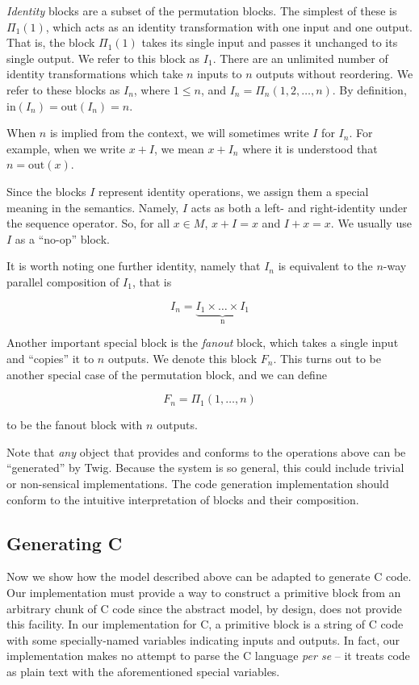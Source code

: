 \emph{Identity} blocks are a subset of the permutation blocks. The
simplest of these is $\Pi_1(1)$, which acts as an identity
transformation with one input and one output. That is, the block
$\Pi_1(1)$ takes its single input and passes it unchanged to its
single output. We refer to this block as $I_1$. There are an
unlimited number of identity transformations which take $n$ inputs
to $n$ outputs without reordering. We refer to these blocks as
$I_n$, where $1 \leq n$, and $I_n = \Pi_n(1,2,\ldots,n)$. By
definition, $\mbox{in}(I_n) = \mbox{out}(I_n) = n$.

When $n$ is implied from the context, we will sometimes write $I$
for $I_n$. For example, when we write $x+I$, we mean $x+I_n$ where
it is understood that $n = \mbox{out}(x)$.

Since the blocks $I$ represent identity operations, we assign them
a special meaning in the semantics. Namely, $I$ acts as both a
left- and right-identity under the sequence operator. So, for all
$x \in M$, $x + I = x$ and $I + x = x$. We usually use $I$ as a
``no-op'' block.

It is worth noting one further identity, namely that $I_n$ is
equivalent to the $n$-way parallel composition of $I_1$, that is

\[
I_n = \underbrace{I_1 \times \ldots \times I_1}_\text{n}
\]

Another important special block is the \emph{fanout} block, which
takes a single input and ``copies'' it to $n$ outputs. We denote
this block $F_n$. This turns out to be another special case of the
permutation block, and we can define

\[
F_n = \Pi_1(1,\ldots,n)
\]

to be the fanout block with $n$ outputs.

Note that \emph{any} object that provides and conforms to the
operations above can be ``generated'' by Twig. Because the system
is so general, this could include trivial or non-sensical
implementations. The code generation implementation should conform
to the intuitive interpretation of blocks and their composition.


\subsection{Generating C}
\label{sec:code-gen:c}

Now we show how the model described above can be adapted to
generate C code. Our implementation must provide a way to
construct a primitive block from an arbitrary chunk of C code
since the abstract model, by design, does not provide this
facility. In our implementation for C, a primitive block is a
string of C code with some specially-named variables indicating
inputs and outputs. In fact, our implementation makes no attempt
to parse the C language \emph{per se} -- it treats code as plain
text with the aforementioned special variables.

